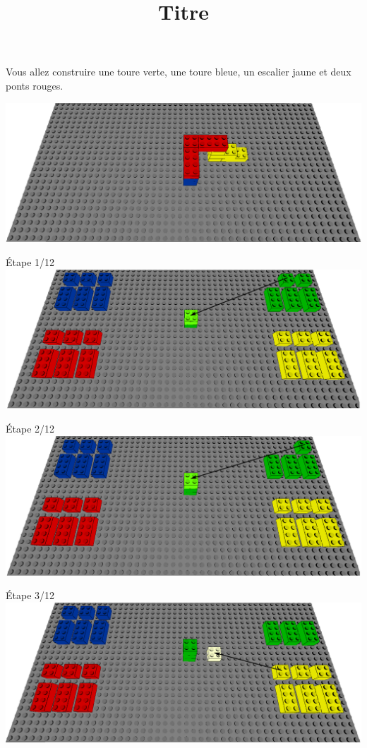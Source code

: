 \documentclass[aspectratio=169]{beamer}
\title{Titre}
\begin{document}
\begin{frame}
    Vous allez construire une toure verte, une toure bleue, un escalier jaune et deux ponts rouges.
    \vfill
    \begin{center}
        \includegraphics[width=\linewidth]{figure.png}
    \end{center}
\end{frame}

\begin{frame}
    Étape 1/12
    \vfill
  \includegraphics[width=\linewidth]{step1.png}
\end{frame}

\begin{frame}
    Étape 2/12
    \vfill
  \includegraphics[width=\linewidth]{step2.png}
\end{frame}

\begin{frame}
    Étape 3/12
    \vfill
  \includegraphics[width=\linewidth]{step3.png}
\end{frame}
\end{document}
